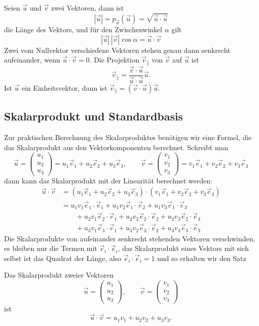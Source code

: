 \begin{satz}
Seien $\vec u$ und $\vec v$ zwei Vektoren, dann ist
\[
|\vec u|=p_{\vec u}(\vec u)=\sqrt{\vec u\cdot\vec u}
\]
die Länge des Vektors, und für den Zwischenwinkel $\alpha$ gilt
\[
|\vec u|\,|\vec v|\cos\alpha=\vec u\cdot\vec v
\]
Zwei vom Nullvektor verschiedene Vektoren  stehen genau dann senkrecht
aufeinander, wenn $\vec u\cdot\vec v=0$.
Die Projektion $\vec v_{\|}$ von $\vec v$ auf $\vec u$ ist
\[
\vec v_{\|}=\frac{\vec v\cdot\vec u}{\vec u\cdot\vec u}\vec u.
\]
Ist $\vec u$ ein Einheitsvektor, dann ist $\vec v_{\|}=(\vec v\cdot \vec u)\vec u$.
\end{satz}

\subsection{Skalarprodukt und Standardbasis}
Zur praktischen Berechnung des Skalarproduktes benötigen wir
eine Formel, die das Skalarprodukt aus den Vektorkomponenten
berechnet.
Schreibt man
\[
\vec u=\begin{pmatrix}u_1\\u_2\\u_3\end{pmatrix}
=u_1\vec e_1+u_2\vec e_2+u_3\vec e_3
,
\qquad
\vec v=\begin{pmatrix}v_1\\v_2\\v_3\end{pmatrix}
=v_1\vec e_1+v_2\vec e_2+v_3\vec e_3
\]
dann kann das Skalarprodukt mit der Linearität berechnet werden:
\begin{align*}
\vec u\cdot\vec v
&=
(u_1\vec e_1+u_2\vec e_2+u_3\vec e_3)\cdot
(v_1\vec e_1+v_2\vec e_2+v_3\vec e_3)
\\
&=
u_1v_1\vec e_1\cdot\vec e_1+
u_1v_2\vec e_1\cdot\vec e_2+
u_1v_3\vec e_1\cdot\vec e_3\\
&\qquad +
u_2v_1\vec e_2\cdot\vec e_1+
u_2v_2\vec e_2\cdot\vec e_2+
u_2v_3\vec e_2\cdot\vec e_3\\
&\qquad+
u_3v_1\vec e_3\cdot\vec e_1+
u_3v_2\vec e_3\cdot\vec e_2+
u_3v_3\vec e_3\cdot\vec e_3
\end{align*}
Die Skalarprodukte von aufeinander senkrecht stehenden Vektoren
verschwinden, es bleiben nur die Termen mit $\vec e_i\cdot\vec e_i$,
das Skalarprodukt eines Vektors mit sich selbst ist das Quadrat
der Länge, also $\vec e_i\cdot \vec e_i=1$ und so erhalten wir den
Satz
\begin{satz}
Das Skalarprodukt zweier Vektoren
\[
\vec u=\begin{pmatrix}u_1\\u_2\\u_3\end{pmatrix},
\qquad
\vec v=\begin{pmatrix}v_1\\v_2\\v_3\end{pmatrix}
\]
ist
\[
\vec u\cdot\vec v
=
u_1v_1+u_2v_2+u_3v_3.
\]
\end{satz}

